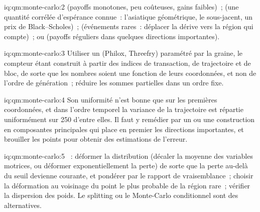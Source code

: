 \begin{solution}{iq:qm:monte-carlo:2}
 (payoffs monotones, peu coûteuses, gains faibles)~;  (une quantité corrélée d'espérance connue~: l'asiatique géométrique, le sous-jacent, un prix de Black--Scholes)~; 
(événements rares~: déplacer la dérive vers la région qui compte)~;  ou  (payoffs réguliers dans quelques directions importantes).
\end{solution}

\begin{solution}{iq:qm:monte-carlo:3}
Utiliser un  (Philox, Threefry) paramétré par la graine, le compteur étant construit à partir des indices de transaction, de trajectoire et de bloc, de sorte que les nombres soient une fonction de leurs coordonnées, et non de l'ordre
de génération~; réduire les sommes partielles dans un ordre fixe.
\end{solution}

\begin{solution}{iq:qm:monte-carlo:4}
Son uniformité n'est bonne que sur les premières coordonnées, et dans l'ordre temporel la variance de la trajectoire est répartie uniformément sur 250 d'entre elles. Il faut y remédier par un  ou une construction en composantes principales qui
place en premier les directions importantes, et brouiller les points pour obtenir des estimations de l'erreur.
\end{solution}

\begin{solution}{iq:qm:monte-carlo:5}
~: déformer la distribution (décaler la moyenne des variables motrices, ou déformer exponentiellement la perte) de sorte que la perte au-delà du seuil devienne courante, et pondérer par le rapport de vraisemblance~; choisir la
déformation au voisinage du point le plus probable de la région rare~; vérifier la dispersion des poids. Le splitting ou le Monte-Carlo conditionnel sont des alternatives.
\end{solution}

